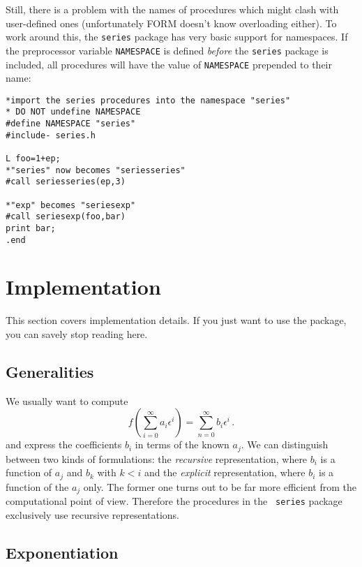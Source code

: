 \documentclass[titlepage]{article}
\begin{document}
Still, there is a problem with the names of procedures which might clash
with user-defined ones (unfortunately FORM doesn't know overloading
either). To work around this, the {\tt series} package has very basic
support for namespaces. If the preprocessor variable {\tt NAMESPACE} is
defined {\em before} the {\tt series} package is included, all
procedures will have the value of {\tt NAMESPACE} prepended to their name:
\begin{verbatim}
*import the series procedures into the namespace "series"
* DO NOT undefine NAMESPACE
#define NAMESPACE "series"
#include- series.h

L foo=1+ep;
*"series" now becomes "seriesseries"
#call seriesseries(ep,3)

*"exp" becomes "seriesexp"
#call seriesexp(foo,bar)
print bar;
.end
\end{verbatim}

\appendix

\section{Implementation}
\label{sec:impl}

This section covers implementation details. If you just want to use the
package, you can savely stop reading here.

\subsection{Generalities}
\label{sec:impl_general}


 We usually want to compute
\begin{equation}
  \label{eq:def}
  f\left(\sum_{i=0}^{\infty}a_i \epsilon^i\right)=\sum_{n=0}^\infty b_i \epsilon^i\,.
\end{equation}
and express the coefficients $b_i$ in terms of the known $a_j$. We can
distinguish between two kinds of formulations: the {\it recursive} representation,
where $b_i$ is a function of $a_j$ and $b_k$ with $k < i$ and the {\it
  explicit} representation, where $b_i$ is a function of the $a_j$ only.
The former one turns out to be far more efficient from the
computational point of view. Therefore the procedures in the {\tt
  series} package exclusively use recursive representations.

\subsection{Exponentiation}
\label{sec:impl_exp}
\end{document}

